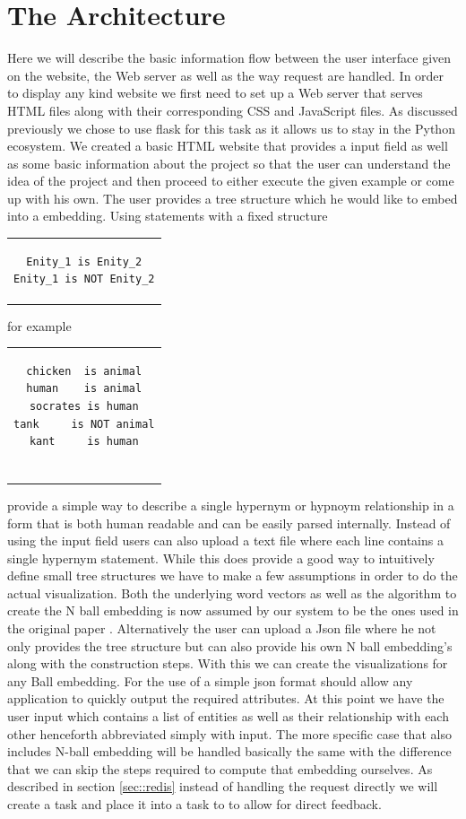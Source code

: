 \documentclass[]{article}
\begin{document}
\section{The Architecture}
\label{sec::arch}
Here we will describe the basic information flow between the user interface given on the website, the Web server as well as the way request are handled. In order to display any kind website we first need to set up a Web server that serves HTML files along with their corresponding CSS and JavaScript files. As discussed previously we chose to use flask for this task as it allows us to stay in the Python ecosystem. We created a basic HTML website that provides a input field as well as some basic information about the project so that the user can understand the idea of the project and then proceed to either execute the given example or come up with his own. 
The user provides a tree structure which he would like to embed into a  embedding. Using statements with a fixed structure
\begin{center}
	
\begin{tabular}{c}
\begin{lstlisting}
Enity_1 is Enity_2
Enity_1 is NOT Enity_2
\end{lstlisting}
\end{tabular}
	
for example
	
\begin{tabular}{c}
\begin{lstlisting}
chicken  is animal
human    is animal
socrates is human
tank     is NOT animal
kant     is human
		
\end{lstlisting}
\end{tabular}
\end{center}
provide a simple way to describe a single hypernym or hypnoym relationship in a form that is both human readable and can be easily parsed internally. Instead of using the input field users can also upload a text file where each line contains a single hypernym statement. While this does provide a good way to intuitively define small tree structures we have to make a few assumptions in order to do the actual visualization. Both the underlying word vectors as well as the algorithm to create the N ball embedding is now assumed by our system to be the ones used in the original paper \cite{dong2018encoding}. Alternatively the user can upload a Json file where he not only provides the tree structure but can also provide his own N ball embedding's along with the construction steps. With this we can create the visualizations for any Ball embedding. For the use of a simple json format should allow any application to quickly output the required attributes. 
At this point we have the user input which contains a list of entities as well as their relationship with each other henceforth abbreviated simply with input. The more specific case that also includes N-ball embedding will be handled basically the same with the difference that we can skip the steps required to compute that embedding ourselves. As described in section \ref{sec::redis} instead of handling the request directly we will create a task and place it into a task to to allow for direct feedback.  
\end{document}
